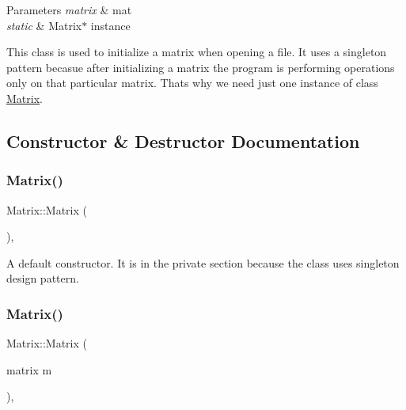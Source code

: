 \begin{DoxyParams}{Parameters}
{\em matrix} & mat \\
\hline
{\em static} & Matrix$\ast$ instance\\
\hline
\end{DoxyParams}
This class is used to initialize a matrix when opening a file. It uses a singleton pattern becasue after initializing a matrix the program is performing operations only on that particular matrix. That\textquotesingle{}s why we need just one instance of class \hyperlink{class_matrix}{Matrix}. 

\subsection{Constructor \& Destructor Documentation}
\mbox{\label{class_matrix_a2dba13c45127354c9f75ef576f49269b}} 
\subsubsection{\texorpdfstring{Matrix()}{Matrix()}\hspace{0.1cm}{\footnotesize\ttfamily [1/2]}}
{\footnotesize\ttfamily Matrix\+::\+Matrix (\begin{DoxyParamCaption}{ }\end{DoxyParamCaption})\hspace{0.3cm}{\ttfamily [inline]}, {\ttfamily [private]}}

A default constructor. It is in the private section because the class uses singleton design pattern. \mbox{\label{class_matrix_abc64f3d5a4f22323a24be2bfabf377cb}} 
\subsubsection{\texorpdfstring{Matrix()}{Matrix()}\hspace{0.1cm}{\footnotesize\ttfamily [2/2]}}
{\footnotesize\ttfamily Matrix\+::\+Matrix (\begin{DoxyParamCaption}\item[{matrix}]{m }\end{DoxyParamCaption})\hspace{0.3cm}{\ttfamily [inline]}, {\ttfamily [private]}}

